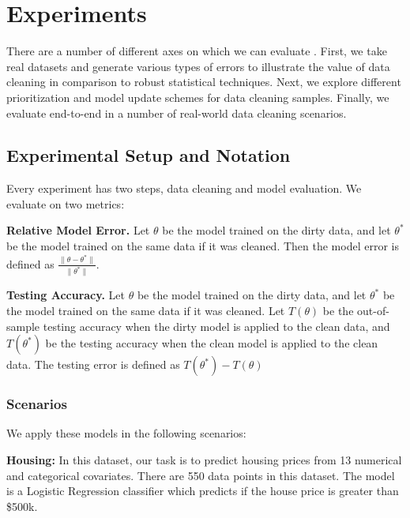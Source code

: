 \section{Experiments}
There are a number of different axes on which we can evaluate \sys.
First, we take real datasets and generate various types of errors to illustrate the value of data cleaning in comparison to robust statistical techniques.
Next, we explore different prioritization and model update schemes for data cleaning samples.
Finally, we evaluate \sys end-to-end in a number of real-world data cleaning scenarios.

\subsection{Experimental Setup and Notation}
Every experiment has two steps, data cleaning and model evaluation.
We evaluate on two metrics:

\vspace{0.5em}

\noindent\textbf{Relative Model Error. } Let $\theta$ be the model trained on the dirty data, and let $\theta^*$ be the model trained on the same data if it was cleaned. Then the model error is defined as $\frac{\|\theta - \theta^*\|}{\|\theta^*\|}$.

\vspace{0.5em}

\noindent\textbf{Testing Accuracy. } Let $\theta$ be the model trained on the dirty data, and let $\theta^*$ be the model trained on the same data if it was cleaned. Let $T(\theta)$ be the out-of-sample testing accuracy when the dirty model is applied to the clean data, and $T(\theta^*)$ be the testing accuracy when the clean model is applied to the clean data. The testing error is defined as $T(\theta^*) - T(\theta)$

\subsubsection{Scenarios}
\noindent We apply these models in the following scenarios:

\vspace{0.5em}

\noindent\textbf{Housing: } In this dataset, our task is to predict housing prices from 13 numerical and categorical covariates. There are 550 data points in this dataset. The model is a Logistic Regression classifier which predicts if the house price is greater than \$500k.

